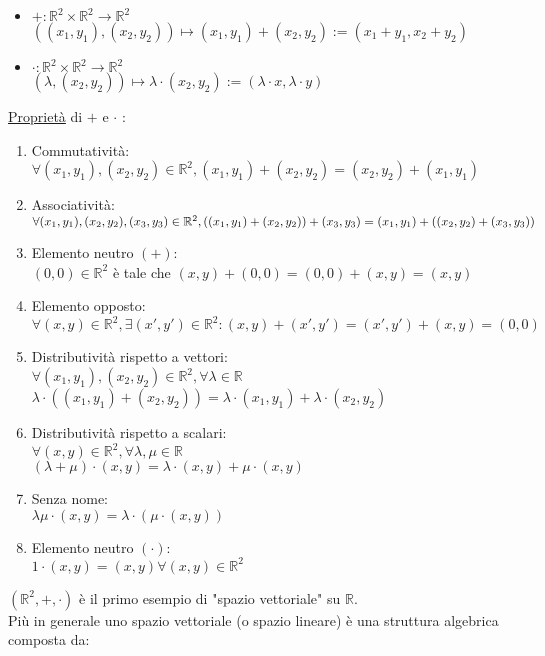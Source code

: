 \documentclass{article}
\newcommand{\ul}[1]{\underline{#1}}
\newcommand{\R}{\mathbb{R}}
\begin{document}
\begin{itemize}
	\item $+: \R^2\times\R^2\rightarrow\R^2$\\$((x_1,y_1),(x_2,y_2))\mapsto(x_1,y_1)+(x_2,y_2):=(x_1+y_1,x_2+y_2)$
	\item $\cdot: \R^2\times\R^2\rightarrow\R^2$\\\hspace*{-0.3em}$(\lambda,(x_2,y_2))\mapsto\lambda\cdot(x_2,y_2):=(\lambda\cdot x,\lambda\cdot y)$
\end{itemize}
\ul{Proprietà} di $+$ e $\cdot$ :
\begin{enumerate}
	\item Commutatività:\\$\forall(x_1,y_1),(x_2,y_2)\in\R^2, (x_1,y_1)+(x_2,y_2)=(x_2,y_2)+(x_1,y_1)$
	\item Associatività:\\$\forall(x_1,y_1),(x_2,y_2),(x_3,y_3)\in\R^2,\\((x_1,y_1)+(x_2,y_2))+(x_3,y_3)=(x_1,y_1)+((x_2,y_2)+(x_3,y_3))$
	\item Elemento neutro $(+)$:\\$(0,0)\in\R^2$ è tale che $(x,y)+(0,0)=(0,0)+(x,y)=(x,y)$
	\item Elemento opposto:\\$\forall(x,y)\in\R^2,\exists(x',y')\in\R^2:(x,y)+(x',y')=(x',y')+(x,y)=(0,0)$
	\item Distributività rispetto a vettori:\\$\forall(x_1,y_1),(x_2,y_2)\in\R^2,\forall\lambda\in\R$\\$\lambda\cdot((x_1,y_1)+(x_2,y_2))=\lambda\cdot(x_1,y_1)+\lambda\cdot(x_2,y_2)$
	\item Distributività rispetto a scalari:\\$\forall(x,y)\in\R^2,\forall\lambda,\mu\in\R$\\$(\lambda+\mu)\cdot(x,y)=\lambda\cdot(x,y)+\mu\cdot(x,y)$
	\item Senza nome:\\$\lambda\mu\cdot(x,y)=\lambda\cdot(\mu\cdot(x,y))$
	\item Elemento neutro $(\cdot)$:\\$1\cdot(x,y)=(x,y)\forall(x,y)\in\R^2$
\end{enumerate}
$(\R^2,+,\cdot)$ è il primo esempio di "spazio vettoriale" su $\R$.\vspace*{1em}\\
Più in generale uno spazio vettoriale (o spazio lineare) è una struttura algebrica composta da:
\end{document}
